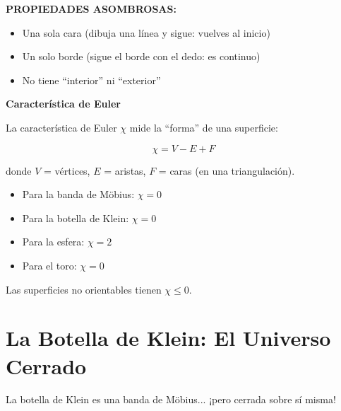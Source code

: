 \textbf{PROPIEDADES ASOMBROSAS:}
\begin{itemize}
    \item Una sola cara (dibuja una línea y sigue: vuelves al inicio)
    \item Un solo borde (sigue el borde con el dedo: es continuo)
    \item No tiene ``interior'' ni ``exterior''
\end{itemize}

\begin{nivelmatematico}
\textbf{Característica de Euler}

La característica de Euler $\chi$ mide la ``forma'' de una superficie:

\begin{equation}
\chi = V - E + F
\end{equation}

donde $V$ = vértices, $E$ = aristas, $F$ = caras (en una triangulación).

\begin{itemize}
    \item Para la banda de Möbius: $\chi = 0$
    \item Para la botella de Klein: $\chi = 0$
    \item Para la esfera: $\chi = 2$
    \item Para el toro: $\chi = 0$
\end{itemize}

Las superficies no orientables tienen $\chi \leq 0$.
\end{nivelmatematico}


\section{La Botella de Klein: El Universo Cerrado}

La botella de Klein es una banda de Möbius... ¡pero cerrada sobre sí misma!

